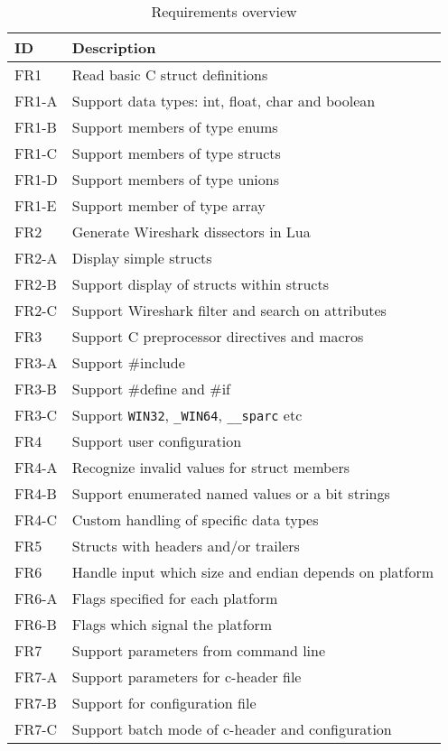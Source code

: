\begin{table}[H] \small \center
\caption{Requirements overview\label{tab:reqsoverview}}
\begin{tabular}{l l}
	\toprule ID & Description \\ \midrule
	FR1 & Read basic C struct definitions \\
	FR1-A & Support data types: int, float, char and boolean \\
	FR1-B & Support members of type enums \\
	FR1-C & Support members of type structs \\
	FR1-D & Support members of type unions \\
	FR1-E & Support member of type array \\
	\addlinespace
	FR2 & Generate Wireshark dissectors in Lua \\
	FR2-A & Display simple structs \\
	FR2-B & Support display of structs within structs \\
	FR2-C & Support Wireshark filter and search on attributes \\
	\addlinespace
	FR3 & Support C preprocessor directives and macros \\
	FR3-A & Support \#include \\
	FR3-B & Support \#define and \#if \\
	FR3-C & Support \verb+WIN32+, \verb+_WIN64+, \verb+__sparc+ etc \\
	\addlinespace
	FR4 & Support user configuration \\
	FR4-A & Recognize invalid values for struct members \\
	FR4-B & Support enumerated named values or a bit strings \\
	FR4-C & Custom handling of specific data types \\
	\addlinespace
	FR5 & Structs with headers and/or trailers \\
	\addlinespace
	FR6 & Handle input which size and endian depends on platform \\
	FR6-A & Flags specified for each platform \\
	FR6-B & Flags which signal the platform \\
	\addlinespace
	FR7 & Support parameters from command line \\
	FR7-A & Support parameters for c-header file \\
	FR7-B & Support for configuration file \\
	FR7-C & Support batch mode of c-header and configuration \\

\end{tabular}
\end{table}
